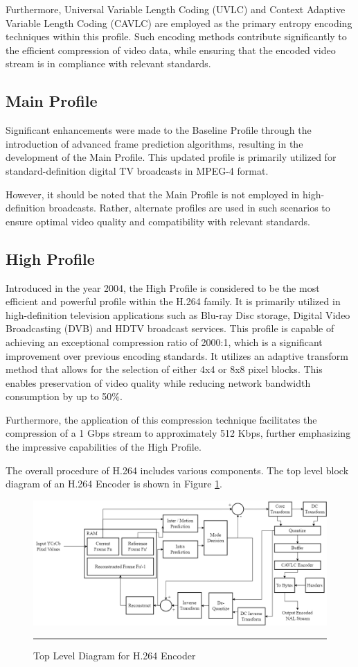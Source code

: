 Furthermore, Universal Variable Length Coding (UVLC) and Context Adaptive Variable Length Coding (CAVLC) are employed as the primary entropy encoding techniques within this profile. Such encoding methods contribute significantly to the efficient compression of video data, while ensuring that the encoded video stream is in compliance with relevant standards. 

\subsection{Main Profile}
Significant enhancements were made to the Baseline Profile through the introduction of advanced frame prediction algorithms, resulting in the development of the Main Profile. This updated profile is primarily utilized for standard-definition digital TV broadcasts in MPEG-4 format.

However, it should be noted that the Main Profile is not employed in high-definition broadcasts. Rather, alternate profiles are used in such scenarios to ensure optimal video quality and compatibility with relevant standards.

\subsection{High Profile}
Introduced in the year 2004, the High Profile is considered to be the most efficient and powerful profile within the H.264 family. It is primarily utilized in high-definition television applications such as Blu-ray Disc storage, Digital Video Broadcasting (DVB) and HDTV broadcast services. This profile is capable of achieving an exceptional compression ratio of 2000:1, which is a significant improvement over previous encoding standards. It utilizes an adaptive transform method that allows for the selection of either 4x4 or 8x8 pixel blocks. This enables preservation of video quality while reducing network bandwidth consumption by up to 50$\%$.

Furthermore, the application of this compression technique facilitates the compression of a 1 Gbps stream to approximately 512 Kbps, further emphasizing the impressive capabilities of the High Profile.

The overall procedure of H.264 includes various components. The top level block diagram of an H.264 Encoder is shown in Figure \ref{fig:toplevel}.

\begin{figure}[H]
	\centering
	\includegraphics[width = 5in]{./Figures/topbd.png}
	\rule{35em}{0.5pt}
	\caption{Top Level Diagram for H.264 Encoder}
	\label{fig:toplevel}
\end{figure}

